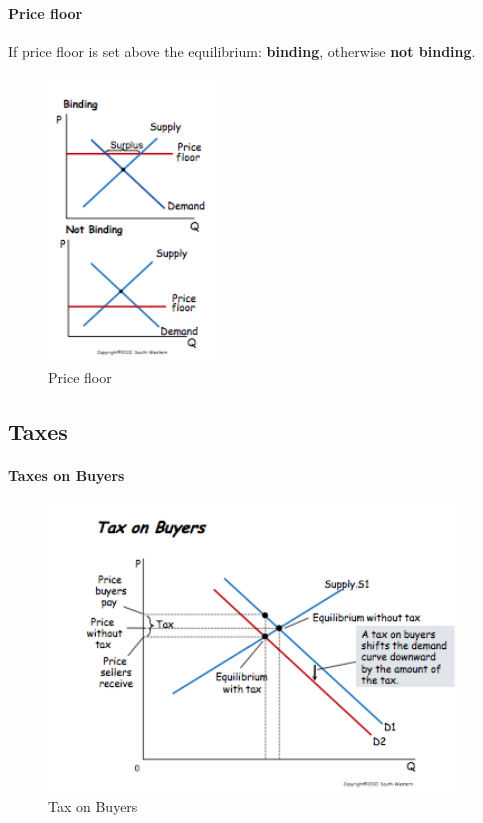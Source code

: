 \documentclass[a4paper,titlepage] {scrartcl}
\begin{document}
\paragraph{Price floor} %
If price floor is set above the equilibrium: \textbf{binding}, otherwise \textbf{not binding}.
\label{par:price_floor}
\begin{figure}[htbp]
	\centering
		\includegraphics[height=3in]{images/floor.png}
	\caption{Price floor}
	\label{fig:images_floor}
\end{figure}


\subsection{Taxes}
\paragraph{Taxes on Buyers} %
\label{par:taxes_on_buyers}

\begin{figure}[htbp]
	\centering
		\includegraphics[height=3in]{images/taxBuyers.png}
	\caption{Tax on Buyers}
	\label{fig:images_taxBuyers}
\end{figure}
\end{document}
